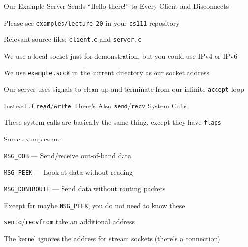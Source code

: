   \begin{frame}{Our Example Server Sends ``Hello there!'' to Every Client and
                Disconnects}

    Please see \texttt{examples/lecture-20} in your \texttt{cs111} repository

    \hspace{2em} Relevant source files: \texttt{client.c} and \texttt{server.c}

    \vspace{2em}

    We use a local socket just for demonstration, but you could use IPv4 or IPv6

    \hspace{2em} We use \texttt{example.sock} in the current directory as our
                 socket address

    \vspace{2em}

    Our server uses signals to clean up and terminate from our infinite
    \texttt{accept} loop
  \end{frame}

  \begin{frame}{Instead of \texttt{read}/\texttt{write} There's Also
                \texttt{send}/\texttt{recv} System Calls}

    These system calls are basically the same thing, except they have
    \texttt{flags}

    \vspace{2em}

    Some examples are:

    \hspace{2em} \texttt{MSG\_OOB} --- Send/receive out-of-band data

    \hspace{2em} \texttt{MSG\_PEEK} --- Look at data without reading

    \hspace{2em} \texttt{MSG\_DONTROUTE} --- Send data without routing packets

    \vspace{2em}

    Except for maybe \texttt{MSG\_PEEK}, you do not need to know these

    \vspace{2em}

    \texttt{sento}/\texttt{recvfrom} take an additional address

    \hspace{2em} The kernel ignores the address for stream sockets (there's a
                 connection)
  \end{frame}

